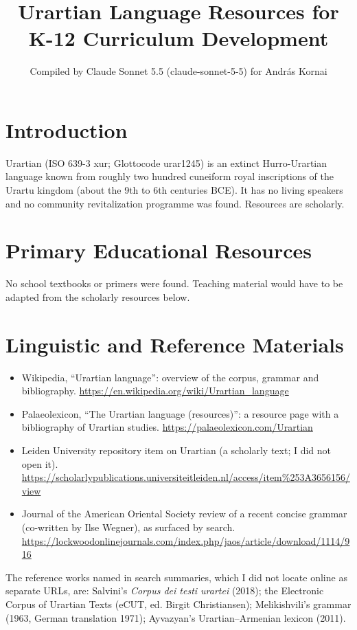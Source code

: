 \documentclass[12pt]{article}
\title{Urartian Language Resources for K-12 Curriculum Development}
\author{Compiled by Claude Sonnet 5.5 (claude-sonnet-5-5) for Andr\'as Kornai}
\date{}
\begin{document}
\maketitle

\section{Introduction}
Urartian (ISO 639-3 xur; Glottocode urar1245) is an extinct Hurro-Urartian language known from roughly two hundred cuneiform royal inscriptions of the Urartu kingdom (about the 9th to 6th centuries BCE). It has no living speakers and no community revitalization programme was found. Resources are scholarly.

\section{Primary Educational Resources}
No school textbooks or primers were found. Teaching material would have to be adapted from the scholarly resources below.

\section{Linguistic and Reference Materials}
\begin{itemize}
\item Wikipedia, ``Urartian language'': overview of the corpus, grammar and bibliography. \url{https://en.wikipedia.org/wiki/Urartian_language}
\item Palaeolexicon, ``The Urartian language (resources)'': a resource page with a bibliography of Urartian studies. \url{https://palaeolexicon.com/Urartian}
\item Leiden University repository item on Urartian (a scholarly text; I did not open it). \url{https://scholarlypublications.universiteitleiden.nl/access/item%253A3656156/view}
\item Journal of the American Oriental Society review of a recent concise grammar (co-written by Ilse Wegner), as surfaced by search. \url{https://lockwoodonlinejournals.com/index.php/jaos/article/download/1114/916}
\end{itemize}
The reference works named in search summaries, which I did not locate online as separate URLs, are: Salvini's \emph{Corpus dei testi urartei} (2018); the Electronic Corpus of Urartian Texts (eCUT, ed. Birgit Christiansen); Melikishvili's grammar (1963, German translation 1971); Ayvazyan's Urartian--Armenian lexicon (2011).
\end{document}
